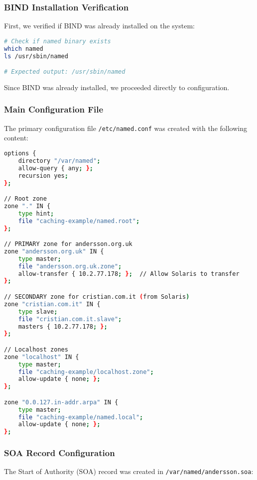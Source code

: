 \documentclass[12pt,a4paper]{article}
\begin{document}
\subsubsection{BIND Installation Verification}
First, we verified if BIND was already installed on the system:

\begin{lstlisting}[language=bash, caption=Checking BIND Installation]
# Check if named binary exists
which named
ls /usr/sbin/named

# Expected output: /usr/sbin/named
\end{lstlisting}

Since BIND was already installed, we proceeded directly to configuration.

\subsubsection{Main Configuration File}
The primary configuration file \texttt{/etc/named.conf} was created with the following content:

\begin{lstlisting}[language=bash, caption=Slackware named.conf Configuration]
options {
    directory "/var/named";
    allow-query { any; };
    recursion yes;
};

// Root zone
zone "." IN {
    type hint;
    file "caching-example/named.root";
};

// PRIMARY zone for andersson.org.uk
zone "andersson.org.uk" IN {
    type master;
    file "andersson.org.uk.zone";
    allow-transfer { 10.2.77.178; };  // Allow Solaris to transfer
};

// SECONDARY zone for cristian.com.it (from Solaris)
zone "cristian.com.it" IN {
    type slave;
    file "cristian.com.it.slave";
    masters { 10.2.77.178; };
};

// Localhost zones
zone "localhost" IN {
    type master;
    file "caching-example/localhost.zone";
    allow-update { none; };
};

zone "0.0.127.in-addr.arpa" IN {
    type master;
    file "caching-example/named.local";
    allow-update { none; };
};
\end{lstlisting}

\subsubsection{SOA Record Configuration}
The Start of Authority (SOA) record was created in \texttt{/var/named/andersson.soa}:
\end{document}
